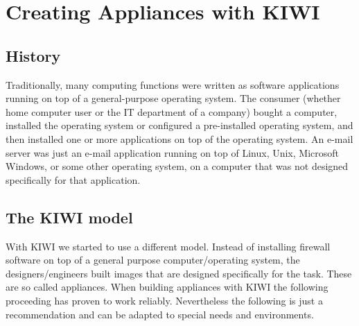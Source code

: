 \chapter{Creating Appliances with KIWI}
\label{chapter:appliance}
\minitoc

\section{History}
Traditionally, many computing functions were written as software applications
running on top of a general-purpose operating system. The consumer
(whether home computer user or the IT department of a company) bought a
computer, installed the operating system or configured a pre-installed
operating system, and then installed one or more applications on top of
the operating system. An e-mail server was just an e-mail application
running on top of Linux, Unix, Microsoft Windows, or some other operating
system, on a computer that was not designed specifically for that application.

\section{The KIWI model}
With KIWI we started to use a different model. Instead of installing
firewall software on top of a general purpose computer/operating system,
the designers/engineers built images that are designed specifically for
the task. These are so called appliances.
When building appliances with KIWI the following proceeding has proven
to work reliably. Nevertheless the following is just a recommendation
and can be adapted to special needs and environments.

